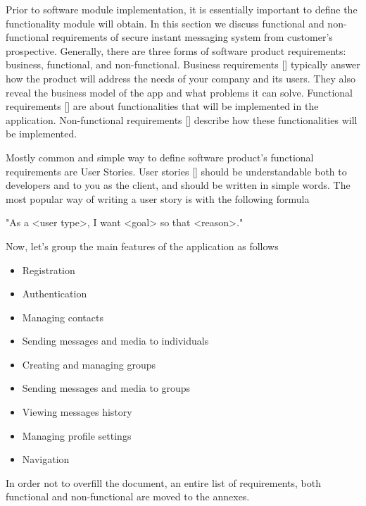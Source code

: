 Prior to software module implementation, it is essentially important to define the functionality module will obtain.
In this section we discuss functional and non-functional requirements of secure instant messaging system from customer's prospective.
Generally, there are three forms of software product requirements: business, functional, and non-functional.
Business requirements [\cite{dilworth2007creation}] typically answer how the product will address the needs of your company and its users.
They also reveal the business model of the app and what problems it can solve.
Functional requirements [\cite{malan2001functional}] are about functionalities that will be implemented in the application.
Non-functional requirements [\cite{chung2012non}] describe how these functionalities will be implemented.

Mostly common and simple way to define software product's functional requirements are User Stories.
User stories [\cite{cohn2004user}] should be understandable both to developers and to you as the client, and should be written in simple words.
The most popular way of writing a user story is with the following formula

\begin{center}
    \begin{spverbatim}
        "As a <user type>, I want <goal> so that <reason>."
    \end{spverbatim}
\end{center}

Now, let's group the main features of the application as follows

\begin{itemize}
    \item Registration
    \item Authentication
    \item Managing contacts
    \item Sending messages and media to individuals
    \item Creating and managing groups
    \item Sending messages and media to groups
    \item Viewing messages history
    \item Managing profile settings
    \item Navigation
\end{itemize}

In order not to overfill the document, an entire list of requirements, both functional and non-functional
are moved to the annexes.